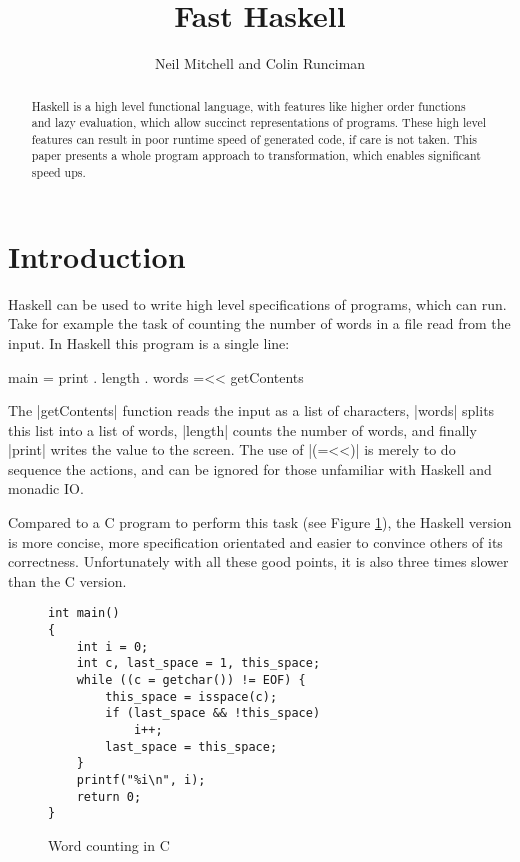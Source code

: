 \documentclass{llncs}
\begin{document}
\title{Fast Haskell}

\author{Neil Mitchell and Colin Runciman}


\maketitle              %

\begin{abstract}
Haskell is a high level functional language, with features like higher order functions and lazy evaluation, which allow succinct representations of programs. These high level features can result in poor runtime speed of generated code, if care is not taken. This paper presents a whole program approach to transformation, which enables significant speed ups.
\end{abstract}

\section{Introduction}

Haskell can be used to write high level specifications of programs, which can run. Take for example the task of counting the number of words in a file read from the input. In Haskell this program is a single line:

\begin{code}
main = print . length . words =<< getContents
\end{code}

The |getContents| function reads the input as a list of characters, |words| splits this list into a list of words, |length| counts the number of words, and finally |print| writes the value to the screen. The use of |(=<<)| is merely to do sequence the actions, and can be ignored for those unfamiliar with Haskell and monadic IO.

Compared to a C program to perform this task (see Figure \ref{fig:c_words}), the Haskell version is more concise, more specification orientated and easier to convince others of its correctness. Unfortunately with all these good points,  it is also three times slower than the C version.

\begin{figure}[tb]
\begin{verbatim}
int main()
{
	int i = 0;
	int c, last_space = 1, this_space;
	while ((c = getchar()) != EOF) {
		this_space = isspace(c);
		if (last_space && !this_space)
			i++;
		last_space = this_space;
	}
	printf("%i\n", i);
	return 0;
}
\end{verbatim}
\caption{Word counting in C}
\label{fig:c_words}
\end{figure}
\end{document}
